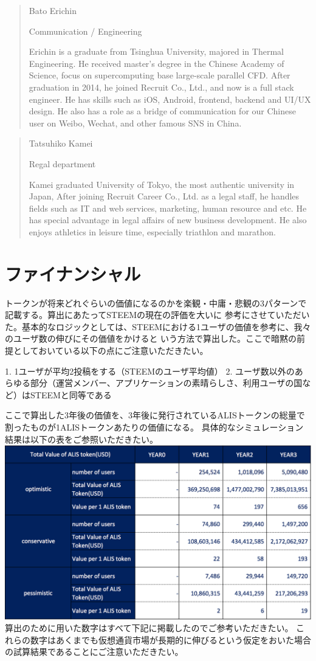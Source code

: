 \documentclass{jsarticle}
\begin{document}
\begin{quote}
Bato Erichin

Communication / Engineering

Erichin is a graduate from Tsinghua University, majored in Thermal Engineering. 
He received master's degree in the Chinese Academy of Science, focus on 
supercomputing base large-scale parallel CFD. After graduation in 2014, he 
joined Recruit Co., Ltd., and now is a full stack engineer. He has skills such as 
iOS, Android, frontend, backend and UI/UX design. He also has a role as a bridge 
of communication for our Chinese user on Weibo, Wechat, and other famous SNS in China.
\end{quote}
\begin{quote}
Tatsuhiko Kamei

Regal department

Kamei graduated University of Tokyo, the most authentic university in Japan, 
After joining Recruit Career Co., Ltd. as a legal staff, he handles fields such as 
IT and web services, marketing, human resource and etc. He has special advantage 
in legal affairs of new business development. He also enjoys athletics in leisure time, 
especially triathlon and marathon.
\end{quote}
\section{ファイナンシャル}
トークンが将来どれぐらいの価値になるのかを楽観・中庸・悲観の3パターンで記載する。算出にあたってSTEEMの現在の評価を大いに
参考にさせていただいた。基本的なロジックとしては、STEEMにおける1ユーザの価値を参考に、我々のユーザ数の伸びにその価値をかけると
いう方法で算出した。ここで暗黙の前提としておいている以下の点にご注意いただきたい。

1. 1ユーザが平均2投稿をする（STEEMのユーザ平均値）
2. ユーザ数以外のあらゆる部分（運営メンバー、アプリケーションの素晴らしさ、利用ユーザの国など）はSTEEMと同等である

ここで算出した3年後の価値を、3年後に発行されているALISトークンの総量で割ったものが1ALISトークンあたりの価値になる。
具体的なシミュレーション結果は以下の表をご参照いただきたい。
	\includegraphics[scale=0.6]{img/financialtable.png}
算出のために用いた数字はすべて下記に掲載したのでご参考いただきたい。
これらの数字はあくまでも仮想通貨市場が長期的に伸びるという仮定をおいた場合の試算結果であることにご注意いただきたい。
\end{document}
